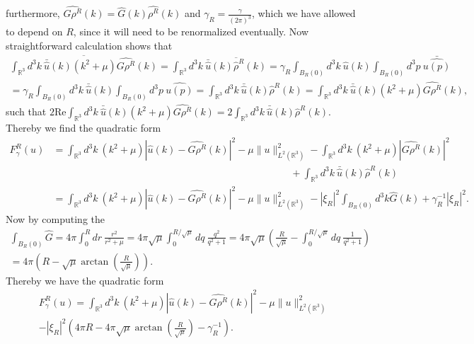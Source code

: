 \documentclass[a4paper,11pt]{article}
\newcommand{\Real}{\text{Re}}
\newcommand{\R}{\mathbb{R}}
\numberwithin{equation}{section}
\begin{document}
furthermore, $ \widehat{G\rho^R}(k)=\hat{G}(k)\hat{\rho^R}(k) $ and $ \gamma_R=\frac{\gamma}{(2\pi)^3} $, which we have allowed to depend on $ R $, since it will need to be renormalized eventually. Now straightforward calculation shows that \begin{equation}
\begin{aligned}
\overline{\int_{\R^3} d^3k\ \bar{\hat{u}}(k)(k^2+\mu)\widehat{G\rho^R}(k)}=\int_{\R^3} d^3k\ \overline{ \bar{\hat{u}}(k)\hat{\rho}^R(k)}=\gamma_R\int_{B_R(0)} d^3k\ \hat{u}(k) \int_{B_R(0)} d^3p\ \bar{\hat{u(p)}} \\
=\gamma_R\int_{B_R(0)} d^3k\ \bar{\hat{u}}(k) \int_{B_R(0)} d^3p\ \hat{u(p)}=\int_{\R^3} d^3k\ \bar{\hat{u}}(k)\hat{\rho}^R(k)=\int_{\R^3} d^3k\ \bar{\hat{u}}(k)(k^2+\mu)\widehat{G\rho^R}(k),
\end{aligned}
\end{equation}
such that $ 2\Real \int_{\R^3} d^3k\ \bar{\hat{u}}(k)(k^2+\mu)\widehat{G\rho^R}(k)=2\int_{\R^3} d^3k\ \bar{\hat{u}}(k)\hat{\rho}^R(k) $. Thereby we find the quadratic form\begin{equation}
\begin{aligned}
F_\gamma^R(u)&=\int_{\R^3} d^3k\ \left(k^2+\mu\right)|\hat{u}(k)-\widehat{G\rho^R}(k)|^2-\mu\|u\|^2_{L^2(\R^3)}-\int_{\R^3} d^3k\ (k^2+\mu)|\widehat{G\rho^R}(k)|^2\\
&\qquad\qquad\qquad\qquad\qquad\qquad\qquad\qquad\qquad\qquad\qquad\qquad+ \int_{\R^3} d^3k\ \bar{\hat{u}}(k)\hat{\rho}^R(k)\\
&=\int_{\R^3} d^3k\ \left(k^2+\mu\right)|\hat{u}(k)-\widehat{G\rho^R}(k)|^2-\mu\|u\|^2_{L^2(\R^3)}-|\xi_R|^2\int_{B_R(0)} d^3k \hat{G}(k)
+ \gamma_R^{-1}|\xi_R|^2.
\end{aligned}
\end{equation}
Now by computing the \begin{equation}
\begin{aligned}
\int_{B_R(0)}\hat{G}=4\pi\int_{0}^{R}dr\ \frac{r^2}{r^2+\mu}=4\pi\sqrt{\mu}\int_{0}^{R/\sqrt{\mu}}dq\ \frac{q^2}{q^2+1}=4\pi\sqrt{\mu}\left(\frac{R}{\sqrt{\mu}}-\int_{0}^{R/\sqrt{\mu}}dq\ \frac{1}{q^2+1}\right)\\=4\pi\left(R-\sqrt{\mu}\arctan\left(\frac{R}{\sqrt{\mu}}\right)\right).
\end{aligned}
\end{equation}
Thereby we have the quadratic form\begin{equation}
\begin{aligned}
F_\gamma^R(u)=\int_{\R^3} d^3k\ \left(k^2+\mu\right)|\hat{u}(k)-\widehat{G\rho^R}(k)|^2-\mu\|u\|^2_{L^2(\R^3)}\\-|\xi_R|^2\left(4\pi R-4\pi\sqrt{\mu}\arctan\left(\frac{R}{\sqrt{\mu}}\right)-\gamma_R^{-1}\right).
\end{aligned}
\end{equation}
\end{document}
